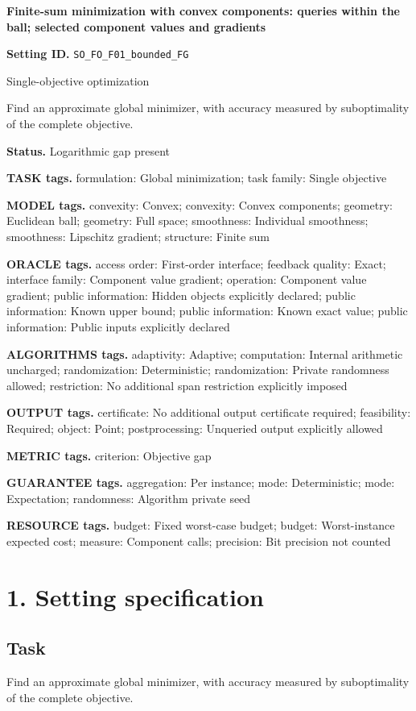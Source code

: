 \documentclass[10pt,a4paper]{article}
\begin{document}
\raggedright

{\LARGE\bfseries\sffamily\color{AtlasNavy} Finite-sum minimization with convex components: queries within the ball; selected component values and gradients\par}\vspace{5pt}
\textbf{Setting ID.} \texttt{SO\_\allowbreak{}FO\_\allowbreak{}F01\_\allowbreak{}bounded\_\allowbreak{}FG}

Single-objective optimization

Find an approximate global minimizer, with accuracy measured by suboptimality of the complete objective.

\textbf{Status.} Logarithmic gap present

\textbf{TASK tags.} formulation: Global minimization; task family: Single objective

\textbf{MODEL tags.} convexity: Convex; convexity: Convex components; geometry: Euclidean ball; geometry: Full space; smoothness: Individual smoothness; smoothness: Lipschitz gradient; structure: Finite sum

\textbf{ORACLE tags.} access order: First-order interface; feedback quality: Exact; interface family: Component value gradient; operation: Component value gradient; public information: Hidden objects explicitly declared; public information: Known upper bound; public information: Known exact value; public information: Public inputs explicitly declared

\textbf{ALGORITHMS tags.} adaptivity: Adaptive; computation: Internal arithmetic uncharged; randomization: Deterministic; randomization: Private randomness allowed; restriction: No additional span restriction explicitly imposed

\textbf{OUTPUT tags.} certificate: No additional output certificate required; feasibility: Required; object: Point; postprocessing: Unqueried output explicitly allowed

\textbf{METRIC tags.} criterion: Objective gap

\textbf{GUARANTEE tags.} aggregation: Per instance; mode: Deterministic; mode: Expectation; randomness: Algorithm private seed

\textbf{RESOURCE tags.} budget: Fixed worst-case budget; budget: Worst-instance expected cost; measure: Component calls; precision: Bit precision not counted

\section{1. Setting specification}
\subsection{Task}
Find an approximate global minimizer, with accuracy measured by suboptimality of the complete objective.
\end{document}
